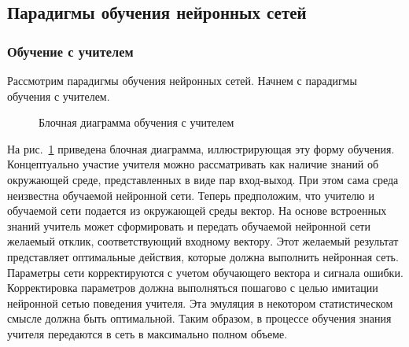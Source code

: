 \subsection{Парадигмы обучения нейронных сетей}

\subsubsection{Обучение с учителем}

Рассмотрим парадигмы обучения нейронных сетей.
Начнем с парадигмы обучения с учителем.

\begin{figure}[ht]
\caption{Блочная диаграмма обучения с учителем}
\label{ris:WithTeacher}
\end{figure}

На рис.~\ref{ris:WithTeacher} приведена блочная диаграмма, иллюстрирующая эту форму обучения. 
Концептуально участие учителя можно рассматривать как наличие знаний об окружающей среде, представленных в виде пар вход-выход.
При этом сама среда неизвестна обучаемой нейронной сети.
Теперь предположим, что учителю и обучаемой сети подается из окружающей среды вектор.
На основе встроенных знаний учитель может сформировать и передать обучаемой нейронной сети желаемый отклик, соответствующий входному вектору.
Этот желаемый результат представляет оптимальные действия, которые должна выполнить нейронная сеть.
Параметры сети корректируются с учетом обучающего вектора и сигнала ошибки.
Корректировка параметров должна выполняться пошагово с целью имитации нейронной сетью поведения учителя.
Эта эмуляция в некотором статистическом смысле должна быть оптимальной.
Таким образом, в процессе обучения знания учителя передаются в сеть в максимально полном объеме.

\clearpage